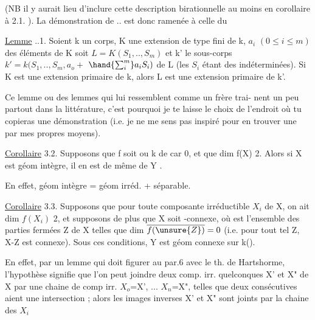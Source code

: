 
(NB il y aurait lieu d'inclure cette description birationnelle au moins
en corollaire à 2.1. ). La démonstration de .. est donc ramenée à
celle du

\uline{Lemme} ..1.  Soient k un corps, K une extension de type fini de k, 
$a_i$ $(0\leqslant i\leqslant m)$ des éléments de K  
 soit $L = K(S_1,..,S_m)$ et k' le sous-corps $k'= k(S_1,..,S_m,a_o +$
$\hand{\sum_{i}^{m}}a_iS_i)$ de L (les $S_i$ étant des indéterminées). \hand{,} Si K est une
extension primaire de k, alors L est une extension primaire de k'.

\margin{$|$} Ce lemme\hand{,} ou des lemmes qui lui ressemblent comme un frère\hand{,} trai-%
nent un peu partout dans la littérature, c'est pourquoi je te laisse le
choix de l'endroit où tu copieras une démonstration (i.e. je ne me sens
pas inspiré pour en trouver une par mes propres moyens).

\uline{Corollaire} 3.2. Supposons que f soit   ou k de car 0,
et que dim f(X)\over{$>$}{$\geqslant$} 2. Alors si X est géom intègre, il en est de même de
Y .

En effet, géom intègre = géom irréd. + séparable.

\uline{Corollaire} 3.3. Supposons  que pour toute composante irréductible $X_i$
de X, on ait dim $f(X_i)$\over{$>$}{$\geqslant$} 2, et supposons de plus que X soit -connexe,
où  est l'ensemble des parties fermées Z de X telles que dim $\overline{f(\unsure{Z})}=0$
(i.e. pour tout tel Z, X-Z est connexe). Sous ces conditions, Y est
géom connexe sur k().

En effet, par un lemme qui doit figurer au par.6 avec le th. de
Hartshorme, l'hypothèse signifie que l'on peut joindre deux comp. irr.
quelconques X' et X" de X par une chaine de comp irr. $X_o$=X', ...
$X_n$=X", telles que deux consécutives aient une intersection ; alors
les images inverses X' et X" sont joints par la chaine des $X_{i}$ 


